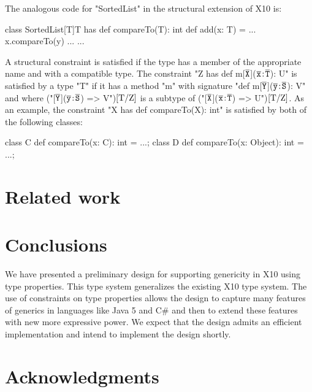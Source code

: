 \documentclass[preprint,nocopyrightspace,9pt]{sigplanconf}
\newcommand\tbar[1]{\ensuremath{\bar{\tt {#1}}}}
\begin{document}
The analogous code for \xcd"SortedList" in the structural
extension of X10 is:
\begin{xten}
class SortedList[T]{T has def compareTo(T): int} {
    def add(x: T) = { ... x.compareTo(y) ... }
    ...
}
\end{xten}

A structural constraint is satisfied if the type has a member of
the appropriate name and with a compatible type.  The constraint
\xcdmath"Z has def m[$\tbar{X}$]($\tbar{x}\ty\tbar{T}$): U"
is satisfied by a type \xcd"T" if it has a method \xcd"m"
with signature
\xcdmath"def m[$\tbar{Y}$]($\tbar{y}\ty\tbar{S}$): V"
and where
(\xcdmath"[$\tbar{Y}$]($\tbar{y}\ty\tbar{S}$) => V")$[\Xcd{T}/\Xcd{Z}]$
is a subtype of
(\xcdmath"[$\tbar{X}$]($\tbar{x}\ty\tbar{T}$) => U")$[\Xcd{T}/\Xcd{Z}]$.
As an example,
the constraint \xcd"X has def compareTo(X): int"
is satisfied by both of the following classes:
\begin{xten}
class C { def compareTo(x: C): int = ...; }
class D { def compareTo(x: Object): int = ...; }
\end{xten}




\section{Related work}
\label{sec:related}


                        

\section{Conclusions}
\label{sec:conclusions}

We have presented a preliminary design for supporting genericity
in X10 using type properties.  This type system generalizes the
existing X10 type system.  The use of constraints on type
properties allows
the design to capture many features of generics in languages
like Java 5 and C\# and then to extend these features with new
more expressive power.
We expect that the design admits an efficient
implementation and intend to implement the design shortly.

\section*{Acknowledgments} 
\end{document}
